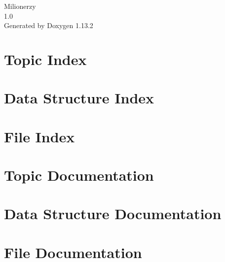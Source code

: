 \documentclass[twoside]{book}
\newcommand{\+}{\discretionary{\mbox{\scriptsize$\hookleftarrow$}}{}{}}
\newcommand{\clearemptydoublepage}{%
    \newpage{\pagestyle{empty}\cleardoublepage}%
  }
\begin{document}
  \raggedbottom
    \hypersetup{pageanchor=false,
                bookmarksnumbered=true,
                pdfencoding=unicode
               }
  \begin{titlepage}
  \vspace*{7cm}
  \begin{center}%
  {\Large Milionerzy}\\
  [1ex]\large 1.\+0 \\
  \vspace*{1cm}
  {\large Generated by Doxygen 1.13.2}\\
  \end{center}
  \end{titlepage}
  \clearemptydoublepage
  \tableofcontents
  \clearemptydoublepage
  \hypersetup{pageanchor=true}
\chapter{Topic Index}

\chapter{Data Structure Index}

\chapter{File Index}

\chapter{Topic Documentation}




\chapter{Data Structure Documentation}



\chapter{File Documentation}

  \backmatter
  \newpage
  \clearemptydoublepage
  \printindex
\end{document}
